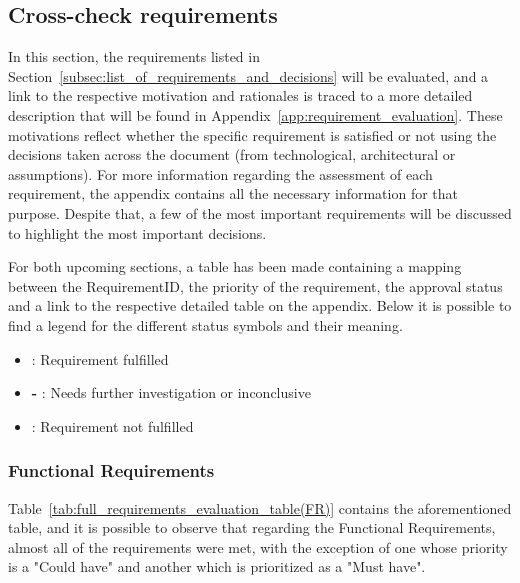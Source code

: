 \subsection{Cross-check requirements}
\label{subsec:cross-check-requirements}

In this section, the requirements listed in Section~\ref{subsec:list_of_requirements_and_decisions} will be evaluated, and a link to the respective motivation and rationales is traced to a more detailed description that will be found in Appendix~\ref{app:requirement_evaluation}. These motivations reflect whether the specific requirement is satisfied or not using the decisions taken across the document (from technological, architectural or assumptions). For more information regarding the assessment of each requirement, the appendix contains all the necessary information for that purpose. Despite that, a few of the most important requirements will be discussed to highlight the most important decisions.

For both upcoming sections, a table has been made containing a mapping between the RequirementID, the priority of the requirement, the approval status and a link to the respective detailed table on the appendix. 
Below it is possible to find a legend for the different status symbols and their meaning.

\begin{itemize}
    \item \greencheck : Requirement fulfilled
    \item \textbf{-} : Needs further investigation or inconclusive
    \item \redcheckk : Requirement not fulfilled
\end{itemize}

\subsubsection{Functional Requirements}
\label{subsubsec:evaluation_functional_requirements}

Table~\ref{tab:full_requirements_evaluation_table(FR)} contains the aforementioned table, and it is possible to observe that regarding the Functional Requirements, almost all of the requirements were met, with the exception of one whose priority is a "Could have" and another which is prioritized as a "Must have".

